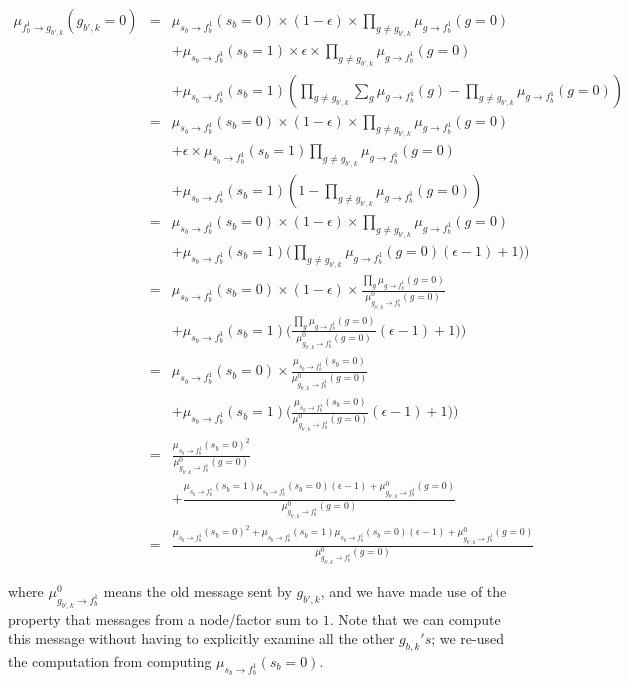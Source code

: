 \documentclass[11pt]{article}
\newcommand{\fb}[1]{f_b^{#1}}
\newcommand{\mSbFb}[1]{\mu_{s_{b} \rightarrow \fb{#1}}}
\begin{document}
\begin{eqnarray}
\mu_{\fb1 \rightarrow g_{b',k}}(g_{b',k}=0) &=& \mSbFb1(s_b=0) \times (1-\epsilon)  \times   \prod_{g \neq g_{b',k}}\mu_{g \rightarrow \fb1}(g=0) \\
& & +  \mSbFb1(s_b=1) \times \epsilon \times \prod_{g \neq g_{b',k}}\mu_{g \rightarrow \fb1}(g=0) \nonumber \\
& & +  \mSbFb1(s_b=1) (\prod_{g \neq g_{b',k}}\sum_{g} \mu_{g \rightarrow \fb1}(g) - \prod_{g \neq g_{b',k}} \mu_{g \rightarrow \fb1}(g=0) )  \nonumber \\
%
&=&  \mSbFb1(s_b=0) \times (1-\epsilon)  \times  \prod_{g \neq g_{b',k}}\mu_{g \rightarrow \fb1}(g=0) \\
& & + \epsilon \times \mSbFb1(s_b=1) \prod_{g \neq g_{b',k}}\mu_{g \rightarrow \fb1}(g=0) \nonumber \\
& & +  \mSbFb1(s_b=1) (1 - \prod_{g \neq g_{b',k}} \mu_{g \rightarrow \fb1}(g=0)) \nonumber \\
%
&=& \mSbFb1(s_b=0) \times (1-\epsilon)  \times  \prod_{g \neq g_{b',k}}\mu_{g \rightarrow \fb1}(g=0) \nonumber \\
& & +  \mSbFb1(s_b=1) \big(   \prod_{g \neq g_{b',k}} \mu_{g \rightarrow \fb1}(g=0)  (\epsilon -1) + 1)  \big) \\
&=&   \mSbFb1(s_b=0) \times (1-\epsilon)  \times \frac{ \prod_{g}\mu_{g \rightarrow \fb1}(g=0)}{\mu^0_{g_{b',k} \rightarrow \fb1}(g=0)}  \\
& & + \mSbFb1(s_b=1) \big( \frac{\prod_{g} \mu_{g \rightarrow \fb1}(g=0) }{\mu^0_{g_{b',k} \rightarrow \fb1}(g=0) }
 (\epsilon -1) + 1)  \big) \nonumber \\
&=&  \mSbFb1(s_b=0)  \times \frac{\mSbFb1(s_b=0)}{\mu^0_{g_{b',k} \rightarrow \fb1}(g=0)}  \\
& & + \mSbFb1(s_b=1) \big( \frac{\mSbFb1(s_b=0)}{\mu^0_{g_{b',k} \rightarrow \fb1}(g=0) } \nonumber
 (\epsilon -1) + 1)  \big) \nonumber \\
&=& \frac{\mSbFb1(s_b=0)^2}{\mu^0_{g_{b',k} \rightarrow \fb1}(g=0)}  \\
& & + \frac{\mSbFb1(s_b=1)\mSbFb1(s_b=0)(\epsilon-1) + \mu^0_{g_{b',k} \rightarrow \fb1}(g=0) }{\mu^0_{g_{b',k} \rightarrow \fb1}(g=0) } \nonumber \\
&=&  \frac{\mSbFb1(s_b=0)^2 + \mSbFb1(s_b=1)\mSbFb1(s_b=0)(\epsilon-1) + \mu^0_{g_{b',k} \rightarrow \fb1}(g=0) }{\mu^0_{g_{b',k} \rightarrow \fb1}(g=0) }
\end{eqnarray}

where  $\mu^0_{g_{b',k} \rightarrow \fb1}$ means the old message sent by $g_{b',k}$, and we have made use of the property that messages from a node/factor sum to $1$. Note that we can compute this message without having to explicitly examine all the other $g_{b,k}'s$; we re-used the computation from computing $\mSbFb1(s_b=0)$.
\end{document}
